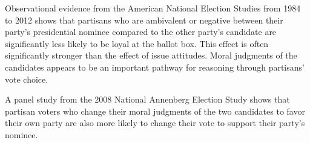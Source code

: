 Observational evidence from the American National Election Studies from 1984 to 2012 shows that partisans who are ambivalent or negative between their party's presidential nominee compared to the other party's candidate are significantly less likely to be loyal at the ballot box. This effect is often significantly stronger than the effect of issue attitudes. Moral judgments of the candidates appears to be an important pathway for reasoning through partisans' vote choice.

A panel study from the 2008 National Annenberg Election Study shows that partisan voters who change their moral judgments of the two candidates to favor their own party are also more likely to change their vote to support their party's nominee. 